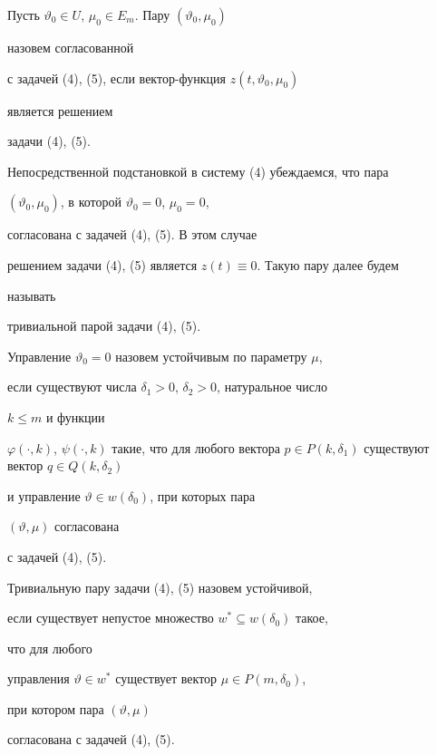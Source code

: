 \begin{defn} 


Пусть $\vartheta_0\in U$, $\mu_0\in E_m$. Пару $(\vartheta_0,\mu_0)$ 


назовем согласованной 


с задачей (4), (5), если вектор-функция $z(t,\vartheta_0,\mu_0)$ 


является решением 


задачи (4), (5). 


\end{defn} 


 


Непосредственной подстановкой в систему (4) убеждаемся, что пара 


$(\vartheta_0,\mu_0)$, в которой $\vartheta_0=0$, $\mu_0=0$, 


согласована с задачей (4), (5). В этом случае 


решением задачи (4), (5) является $z(t)\equiv0$. Такую пару далее будем 


называть 


тривиальной парой задачи (4), (5). 


 


\begin{defn} 


Управление $\vartheta_0=0$ назовем устойчивым по параметру $\mu$, 


если существуют числа $\delta_1>0$, $\delta_2>0$, натуральное число 


$k\le m$ и функции 


$\varphi(\cdot,k)$, $\psi(\cdot,k)$ такие, что для любого вектора $p\in 


P(k,\delta_1)$ существуют вектор $q\in Q(k,\delta_2)$ 


и управление $\vartheta\in w(\delta_0)$, при которых пара 


$(\vartheta,\mu)$ согласована 


с задачей (4), (5). 


\end{defn} 


 


\begin{defn} 


Тривиальную пару задачи (4), (5) назовем устойчивой, 


если существует непустое множество $w^*\subseteq w(\delta_0)$ такое, 


что для любого 


управления $\vartheta\in w^*$ существует вектор $\mu\in P(m,\delta_0)$, 


при котором пара $(\vartheta,\mu)$ 


согласована с задачей (4), (5). 


\end{defn} 


